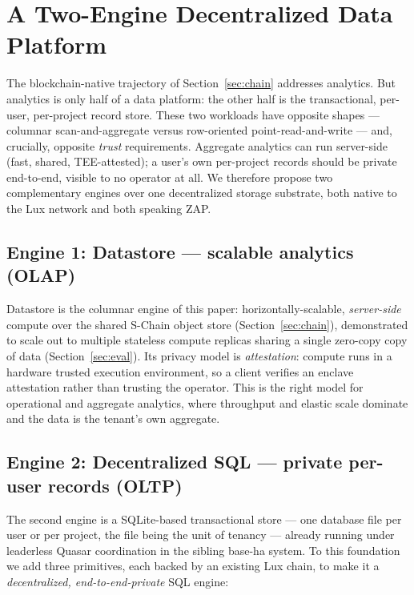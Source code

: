 \section{A Two-Engine Decentralized Data Platform}
\label{sec:twoengine}

The blockchain-native trajectory of Section~\ref{sec:chain} addresses analytics.
But analytics is only half of a data platform: the other half is the
transactional, per-user, per-project record store. These two workloads have
opposite shapes --- columnar scan-and-aggregate versus row-oriented
point-read-and-write --- and, crucially, opposite \emph{trust} requirements.
Aggregate analytics can run server-side (fast, shared, TEE-attested); a user's
own per-project records should be private end-to-end, visible to no operator at
all. We therefore propose two complementary engines over one decentralized
storage substrate, both native to the Lux network and both speaking ZAP.

\subsection{Engine 1: Datastore --- scalable analytics (OLAP)}

Datastore is the columnar engine of this paper: horizontally-scalable,
\emph{server-side} compute over the shared S-Chain object store
(Section~\ref{sec:chain}), demonstrated to scale out to multiple stateless
compute replicas sharing a single zero-copy copy of data
(Section~\ref{sec:eval}). Its privacy model is \emph{attestation}: compute runs
in a hardware trusted execution environment, so a client verifies an enclave
attestation rather than trusting the operator. This is the right model for
operational and aggregate analytics, where throughput and elastic scale dominate
and the data is the tenant's own aggregate.

\subsection{Engine 2: Decentralized SQL --- private per-user records (OLTP)}

The second engine is a SQLite-based transactional store --- one database file
per user or per project, the file being the unit of tenancy --- already running
under leaderless Quasar coordination in the sibling base-ha system. To this
foundation we add three primitives, each backed by an existing Lux chain, to
make it a \emph{decentralized, end-to-end-private} SQL engine:

